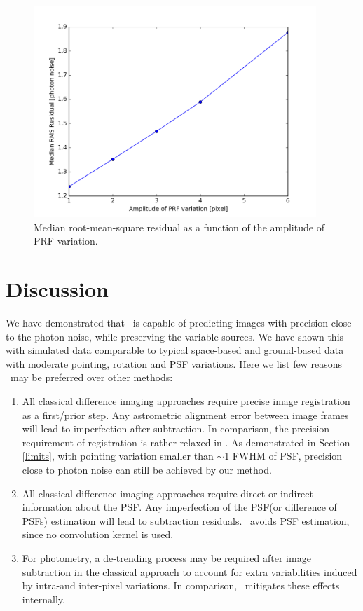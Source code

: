 \begin{figure}[p]
\begin{center}
\includegraphics[width=0.95\textwidth]{figures/cdi/prf_p}
\end{center}
\caption[The demostration of the degradation of performance as a function of PRF variation]{
\label{prf_rms}
 Median root-mean-square residual as a function of the amplitude of PRF variation.
}
\end{figure}

\section{Discussion}
We have demonstrated that \cpmdiff\ is capable of predicting images with precision close to the photon noise, while preserving the variable sources. We have shown this with simulated data comparable to typical space-based and ground-based data with moderate pointing, rotation and PSF variations. 
Here we list few reasons \cpmdiff\ may be preferred over other methods:

\begin{enumerate}
\item All classical difference imaging approaches require precise image registration as a first/prior step. 
Any astrometric alignment error between image frames will lead to imperfection after subtraction.
In comparison, the precision requirement of registration is rather relaxed in \cpmdiff. 
As demonstrated in Section \ref{limits}, with pointing variation smaller than $\sim$1 FWHM of PSF, precision close to photon noise can still be achieved by our method.  

\item All classical difference imaging approaches require direct or indirect information about the PSF. 
Any imperfection of the PSF(or difference of PSFs) estimation will lead to subtraction residuals.
\cpmdiff\ avoids PSF estimation, since no convolution kernel is used.

\item For photometry, a de-trending process may be required after image subtraction in the classical approach to account for extra variabilities induced by intra-and inter-pixel variations.
In comparison, \cpmdiff\ mitigates these effects internally.
\end{enumerate}

